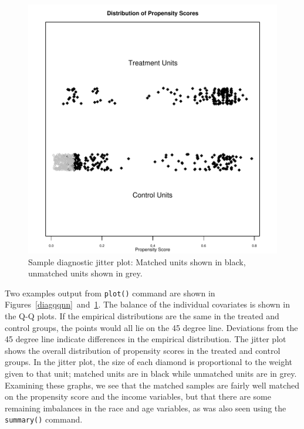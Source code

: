 \begin{figure}[tbp]
  \begin{center}
    \includegraphics[scale=0.5]{figs/jitterplotnn}
    \hfill
    \caption{Sample diagnostic jitter plot: Matched units shown in
      black, unmatched units shown in grey.}
    \label{diagjitternn}
  \end{center}
\end{figure}

Two examples output from {\tt plot()} command are shown in
Figures~\ref{diagqqnn}~and~\ref{diagjitternn}. The balance of the
individual covariates is shown in the Q-Q plots.  If the empirical
distributions are the same in the treated and control groups, the
points would all lie on the 45 degree line.  Deviations from the 45
degree line indicate differences in the empirical distribution.  The
jitter plot shows the overall distribution of propensity scores in the
treated and control groups.  In the jitter plot, the size of each
diamond is proportional to the weight given to that unit; matched
units are in black while unmatched units are in grey.  Examining these
graphs, we see that the matched samples are fairly well matched on the
propensity score and the income variables, but that there are some
remaining imbalances in the race and age variables, as was also seen
using the \texttt{summary()} command.

